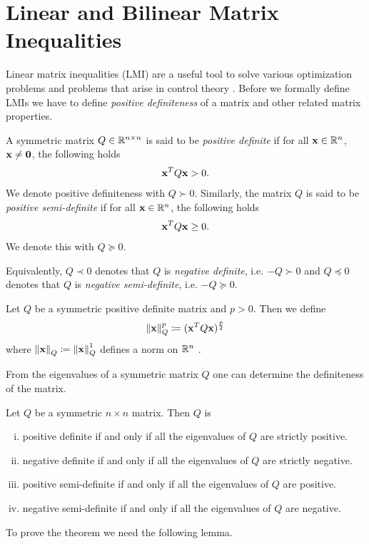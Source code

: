 \documentclass[a4paper,12pt,twoside,BCOR=10mm]{scrbook}
\begin{document}
\section{Linear and Bilinear Matrix Inequalities}\label{SectionLMIBMI}
Linear matrix inequalities (LMI) are a useful tool to solve various optimization problems and problems that arise in control theory \citep{BGFB1994LMIincontrol, BlMi2008setbook, chesi2010LMIsurvey, FSO2013fuzzylya, chesi2009, HaTi2002cdc}. Before we formally define LMIs we have to define \emph{positive definiteness} of a matrix and other related matrix properties.
\begin{definition}\label{Definition PosDef}
A symmetric matrix $Q\in\mathbb{R}^{n\times n}$ is said to be \emph{positive definite} if for all $\mathbf{x}\in \mathbb{R}^{n}$, $\mathbf{x} \neq \mathbf{0}$, the following holds
\begin{align*}
    \mathbf{x}^T Q \mathbf{x} > 0.
\end{align*}
We denote positive definiteness with $Q \succ 0$. Similarly, the matrix $Q$ is said to be \emph{positive semi-definite} if for all $\mathbf{x} \in \mathbb{R}^{n}$, the following holds
\begin{align*}
    \mathbf{x}^T Q \mathbf{x} \geq 0.
\end{align*}
We denote this with $Q \succeq 0$.
\end{definition}
Equivalently, $Q \prec 0$ denotes that $Q$ is \emph{negative definite}, i.e. $-Q \succ 0$ and $Q \preceq 0$ denotes that $Q$ is \emph{negative semi-definite}, i.e. $-Q \succeq 0$.

Let $Q$ be a symmetric positive definite matrix and $p > 0$. Then we define
\begin{align*}
    \left\lVert\mathbf{x}\right\rVert_Q^p \coloneqq (\mathbf{x}^T Q \mathbf{x})^\frac{p}{2}
\end{align*}
where $\left\lVert\mathbf{x}\right\rVert_{Q}^{} \coloneqq \left\lVert\mathbf{x}\right\rVert_{Q}^{1}$ defines a norm on $\mathbb{R}^{n}$ \citep{terrell2009stability}.

From the eigenvalues of a symmetric matrix $Q$ one can determine the definiteness of the matrix.
\begin{theorem}\label{ThmPosDefPosEig}
Let $Q$ be a symmetric $n\times n$ matrix. Then $Q$ is
\begin{enumerate}[i)]
    \item positive definite if and only if all the eigenvalues of $Q$ are strictly positive.
    \item negative definite if and only if all the eigenvalues of $Q$ are strictly negative.
    \item positive semi-definite if and only if all the eigenvalues of $Q$ are positive.
    \item negative semi-definite if and only if all the eigenvalues of $Q$ are negative.
\end{enumerate}
\end{theorem}
To prove the theorem we need the following lemma.
\end{document}
